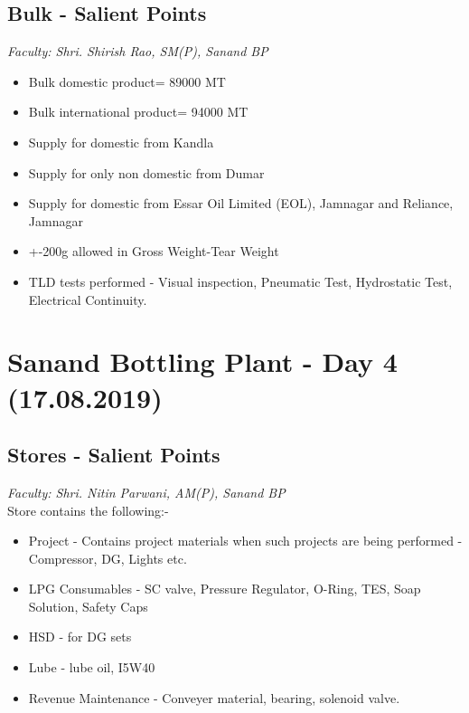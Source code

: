 \documentclass{report}
\begin{document}
	\subsection{Bulk - Salient Points}
	\textit{Faculty: Shri. Shirish Rao, SM(P), Sanand BP}\\
	\begin{itemize}
		\item Bulk domestic product= 89000 MT
		\item Bulk international product= 94000 MT
		\item Supply for domestic from Kandla 
		\item Supply for only non domestic from Dumar
		\item Supply for domestic from Essar Oil Limited (EOL), Jamnagar and Reliance, Jamnagar
		\item +-200g allowed in Gross Weight-Tear Weight
		\item TLD tests performed - Visual inspection, Pneumatic Test, Hydrostatic Test, Electrical Continuity.
	\end{itemize}
	
	\section{Sanand Bottling Plant - Day 4 (17.08.2019)}
	\subsection{Stores - Salient Points}
	\textit{Faculty: Shri. Nitin Parwani, AM(P), Sanand BP}\\
	Store contains the following:-
	\begin{itemize}
		\item Project - Contains project materials when such projects are being performed - Compressor, DG, Lights etc.
		\item LPG Consumables - SC valve, Pressure Regulator, O-Ring, TES, Soap Solution, Safety Caps
		\item HSD - for DG sets
		\item Lube - lube oil, I5W40
		\item Revenue Maintenance - Conveyer material, bearing, solenoid valve.
	\end{itemize}
	
\end{document}
